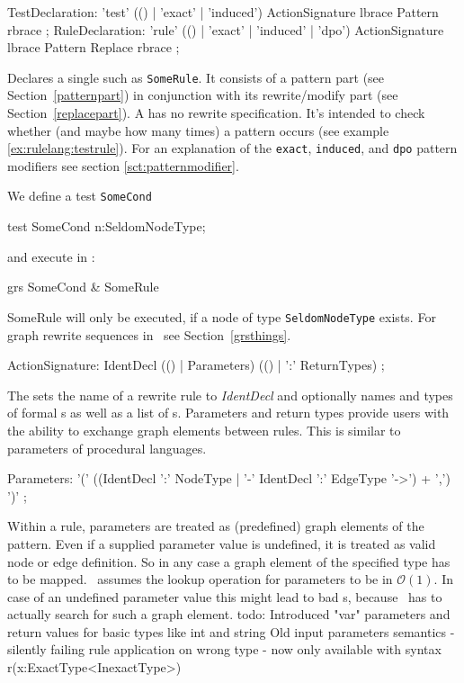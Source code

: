 \begin{rail}
  TestDeclaration: 'test' (() | 'exact' | 'induced') ActionSignature lbrace Pattern rbrace ;
  RuleDeclaration: 'rule' (() | 'exact' | 'induced' | 'dpo') ActionSignature lbrace Pattern Replace rbrace ;
\end{rail}
Declares a single  such as \texttt{SomeRule}. 
It consists of a pattern part (see Section~\ref{patternpart}) in conjunction with its rewrite/modify part (see Section~\ref{replacepart}). 
A  has no rewrite specification. 
It's intended to check whether (and maybe how many times) a pattern occurs (see example \ref{ex:rulelang:testrule}).
For an explanation of the \texttt{exact}, \texttt{induced}, and \texttt{dpo} pattern modifiers see section \ref{sct:patternmodifier}. 
\begin{example}
\label{ex:rulelang:testrule}
We define a test \texttt{SomeCond}
\begin{grgen}
test SomeCond {
  n:SeldomNodeType;
}
\end{grgen}
and execute in \GrShell:
\begin{grshell}
  grs SomeCond & SomeRule
\end{grshell}
SomeRule will only be executed, if a node of type \texttt{SeldomNodeType} exists. For graph rewrite sequences in \GrShell\ see Section~\ref{grsthings}.
\end{example}

\begin{rail}  
  ActionSignature: IdentDecl (() | Parameters) (() | ':' ReturnTypes) ;
\end{rail}
The  sets the name of a rewrite rule to \emph{IdentDecl} and optionally names and types of formal s as well as a list of s. Parameters and return types provide users with the ability to exchange graph elements between rules. This is similar to parameters of procedural languages.

\begin{rail}
  Parameters: '(' ((IdentDecl ':' NodeType | '-' IdentDecl ':' EdgeType '->') + ',') ')' ;
\end{rail}
Within a rule, parameters are treated as (predefined) graph elements of the pattern. Even if a supplied parameter value is undefined, it is treated as valid node or edge definition. So in any case a graph element of the specified type has to be mapped. \GrG\ assumes the lookup operation for parameters to be in $\mathcal{O}(1)$. In case of an undefined parameter value this might lead to bad s, because \GrG\ has to actually search for such a graph element.
todo: Introduced "var" parameters and return values for basic types like int and string
Old input parameters semantics - silently failing rule application on wrong type -
now only available with syntax r(x:ExactType<InexactType>)

